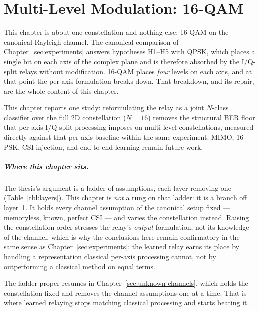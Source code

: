 \chapter{Multi-Level Modulation: 16-QAM}\label{sec:extensions}

This chapter is about one constellation and nothing else: 16-QAM on the canonical Rayleigh channel. The canonical comparison of Chapter~\ref{sec:experiments} answers hypotheses H1--H5 with QPSK, which places a single bit on each axis of the complex plane and is therefore absorbed by the I/Q-split relays without modification. 16-QAM places \emph{four} levels on each axis, and at that point the per-axis formulation breaks down. That breakdown, and its repair, are the whole content of this chapter.

This chapter reports one study: reformulating the relay as a joint $N$-class classifier over the full 2D constellation ($N=16$) removes the structural BER floor that per-axis I/Q-split processing imposes on multi-level constellations, measured directly against that per-axis baseline within the same experiment. MIMO, 16-PSK, CSI injection, and end-to-end learning remain future work.

\paragraph{Where this chapter sits.} The thesis's argument is a ladder of assumptions, each layer removing one (Table~\ref{tbl:layers}). This chapter is \emph{not} a rung on that ladder: it is a branch off layer~1. It holds every channel assumption of the canonical setup fixed --- memoryless, known, perfect CSI --- and varies the constellation instead. Raising the constellation order stresses the relay's \emph{output} formulation, not its knowledge of the channel, which is why the conclusions here remain confirmatory in the same sense as Chapter~\ref{sec:experiments}: the learned relay earns its place by handling a representation classical per-axis processing cannot, not by outperforming a classical method on equal terms.

The ladder proper resumes in Chapter~\ref{sec:unknown-channels}, which holds the constellation fixed and removes the channel assumptions one at a time. That is where learned relaying stops matching classical processing and starts beating it.

